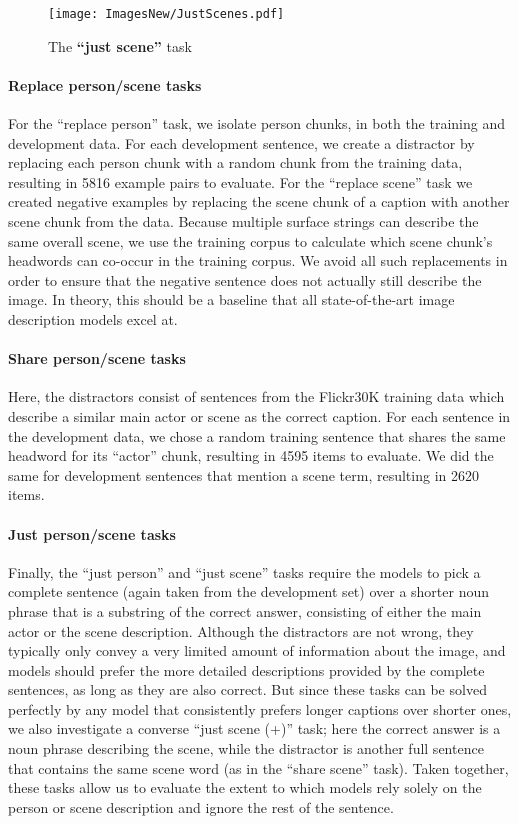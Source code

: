 \documentclass[11pt]{article}
\begin{document}
\begin{figure}[t]
\centering \texttt{[image: ImagesNew/JustScenes.pdf]} \vspace{-0.5in}
\caption{The \textbf{``just scene''} task}
\label{fig:JustScene} 
\end{figure}


\paragraph{Replace person/scene tasks}
For the ``replace person'' task, we isolate person chunks, in both the training and development data. For each development sentence, we create a distractor by replacing each person chunk with a random chunk from the training data, resulting in 5816 example pairs to evaluate. 
For the ``replace scene'' task we created negative examples by replacing the scene chunk of a caption with another scene chunk from the data. Because multiple surface strings can describe the same overall scene, we use the training corpus to calculate which scene chunk's headwords can co-occur in the training corpus. We avoid all such replacements in order to ensure that the negative sentence does not actually still describe the image. In theory, this should be a baseline that all state-of-the-art image description models excel at.

\paragraph{Share person/scene tasks}
Here, the distractors consist of  sentences from the Flickr30K training data  which describe a similar main actor or scene as the correct caption.  For each sentence in the development data, we chose a random training sentence that shares the same headword for its ``actor'' chunk, resulting in 4595 items to evaluate. We did the same for development sentences that mention a scene term, resulting in 2620 items. 

\paragraph{Just person/scene tasks}
Finally, the ``just person'' and ``just scene'' tasks require the models to pick a complete sentence (again taken from the development set) over a shorter noun phrase that is a substring of the correct answer, consisting of either the main actor or the scene description. Although the distractors are not wrong, they typically only convey a very limited amount of information about the image, and models should prefer the more detailed descriptions provided by the complete sentences, as long as they are also correct. But since these tasks can be solved perfectly by any model that consistently prefers longer captions over shorter ones, we also investigate a converse  ``just scene (+)'' task; here the correct answer is a noun phrase describing the scene, while the distractor is another full sentence that contains the same scene word (as in the ``share scene'' task).  Taken together, these tasks allow us to evaluate the extent to which models rely solely on the person or scene description and ignore the rest of the sentence.
\end{document}
